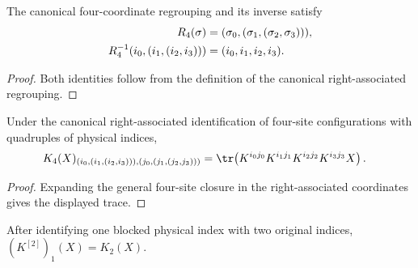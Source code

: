 \begin{lemma}
    \label{lem:fin_four_arrow_equiv_coordinates}
    \leanok
    The canonical four-coordinate regrouping and its inverse satisfy
    \begin{align}
        R_4(\sigma)
         & =(\sigma_0,(\sigma_1,(\sigma_2,\sigma_3))),
        \notag                                         \\
        R_4^{-1}(i_0,(i_1,(i_2,i_3)))
         & =(i_0,i_1,i_2,i_3).
        \notag
    \end{align}
\end{lemma}

\begin{proof}\leanok
    Both identities follow from the definition of the canonical
    right-associated regrouping.
\end{proof}

\begin{lemma}
    \label{thm:mpdo_phys_close_four}
    \leanok
    Under the canonical right-associated identification of four-site
    configurations with quadruples of physical indices,
    \begin{align}
        K_4(X)_{(i_0,(i_1,(i_2,i_3))),(j_0,(j_1,(j_2,j_3)))}
         & =\tr\!\left(K^{i_0j_0}K^{i_1j_1}K^{i_2j_2}K^{i_3j_3}X\right).
        \notag
    \end{align}
\end{lemma}

\begin{proof}\leanok
    Expanding the general four-site closure in the right-associated coordinates
    gives the displayed trace.
\end{proof}

\begin{lemma}
    \label{thm:mpdo_one_site_closure_two_site_blocking}
    \leanok
    After identifying one blocked physical index with two original indices,
    $(K^{[2]})_1(X)=K_2(X)$.
\end{lemma}

